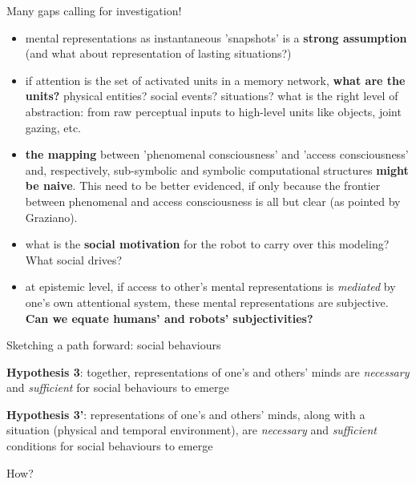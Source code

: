 \documentclass[compress]{beamer}
\begin{document}
\begin{frame}{Many gaps calling for investigation!}

\footnotesize
    \begin{itemize}

        \item<+-> mental representations as instantaneous 'snapshots' is a {\bf strong
            assumption} (and what about representation of lasting situations?)

        \item<+-> if attention is the set of activated units in a memory network,
            {\bf what are the units?} physical entities? social events? situations?
            what is the right level of abstraction: from raw perceptual inputs to
            high-level units like objects, joint gazing, etc.


        \item<+-> {\bf the mapping} between 'phenomenal consciousness' and
            'access consciousness' and, respectively, sub-symbolic and symbolic
            computational structures {\bf might be naive}. This need to be
            better evidenced, if only because the frontier between phenomenal
            and access consciousness is all but clear (as pointed by Graziano).

        \item<+-> what is the {\bf social motivation} for the robot to carry
            over this modeling? What social drives?

        \item<+-> at epistemic level, if access to other's mental
            representations is \emph{mediated} by one's own attentional system,
            these mental representations are subjective. {\bf Can we equate humans'
            and robots' subjectivities?}

    \end{itemize}

\end{frame}


\begin{frame}{Sketching a path forward: social behaviours}

    {\bf Hypothesis 3}: together, representations of one's and others' minds are
    \emph{necessary} and \emph{sufficient} for social behaviours to emerge

    {\bf Hypothesis 3'}: representations of one's and others' minds, along with
    a situation (physical and temporal environment), are \emph{necessary} and
    \emph{sufficient} conditions for social behaviours to emerge

    \pause

    How?


\end{frame}
\end{document}
